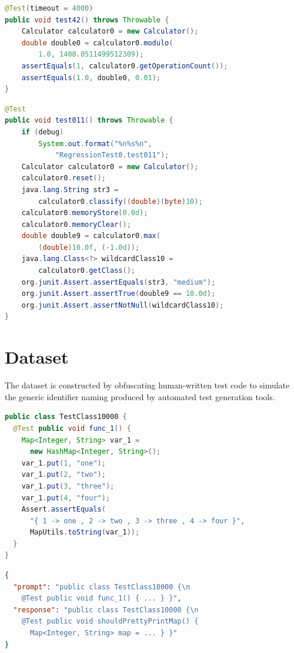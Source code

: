 \documentclass[conference]{IEEEtran}
\begin{document}
\begin{lstlisting}[caption={Example EvoSuite-generated test before renaming},
                   label={lst:evosuite},language=Java]
@Test(timeout = 4000)
public void test42() throws Throwable {
    Calculator calculator0 = new Calculator();
    double double0 = calculator0.modulo(
        1.0, 1408.0511499512309);
    assertEquals(1, calculator0.getOperationCount());
    assertEquals(1.0, double0, 0.01);
}
\end{lstlisting}

\begin{lstlisting}[caption={Example Randoop-generated test before renaming},
                   label={lst:randoop},language=Java]
@Test
public void test011() throws Throwable {
    if (debug)
        System.out.format("%n%s%n",
            "RegressionTest0.test011");
    Calculator calculator0 = new Calculator();
    calculator0.reset();
    java.lang.String str3 =
        calculator0.classify((double)(byte)10);
    calculator0.memoryStore(0.0d);
    calculator0.memoryClear();
    double double9 = calculator0.max(
        (double)10.0f, (-1.0d));
    java.lang.Class<?> wildcardClass10 =
        calculator0.getClass();
    org.junit.Assert.assertEquals(str3, "medium");
    org.junit.Assert.assertTrue(double9 == 10.0d);
    org.junit.Assert.assertNotNull(wildcardClass10);
}
\end{lstlisting}

\section{Dataset}
\label{app:dataset}

The dataset is constructed by obfuscating human-written test code to simulate
the generic identifier naming produced by automated test generation tools.

\begin{lstlisting}[caption={Example obfuscated test case},
                   label={lst:obf-example},language=Java]
public class TestClass10000 {
  @Test public void func_1() {
    Map<Integer, String> var_1 =
      new HashMap<Integer, String>();
    var_1.put(1, "one");
    var_1.put(2, "two");
    var_1.put(3, "three");
    var_1.put(4, "four");
    Assert.assertEquals(
      "{ 1 -> one , 2 -> two , 3 -> three , 4 -> four }",
      MapUtils.toString(var_1));
  }
}
\end{lstlisting}

\begin{lstlisting}[caption={Example JSONL dataset sample},
                   label={lst:dataset-example},language=json]
{
  "prompt": "public class TestClass10000 {\n
    @Test public void func_1() { ... } }",
  "response": "public class TestClass10000 {\n
    @Test public void shouldPrettyPrintMap() {
      Map<Integer, String> map = ... } }"
}
\end{lstlisting}
\end{document}
